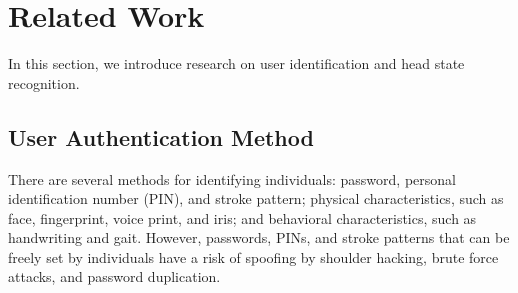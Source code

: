 \documentclass[sigchi,authordraft]{acmart}
\begin{document}


\section{Related Work}
\label{sec:related}
In this section, we introduce research on user identification and head state recognition.




\subsection{User Authentication Method}
There are several methods for identifying individuals: password, personal identification number (PIN), and stroke pattern; physical characteristics, such as face, fingerprint, voice print, and iris; and behavioral characteristics, such as handwriting and gait. However, passwords, PINs, and stroke patterns that can be freely set by individuals have a risk of spoofing by shoulder hacking, brute force attacks, and password duplication.\par
\end{document}
